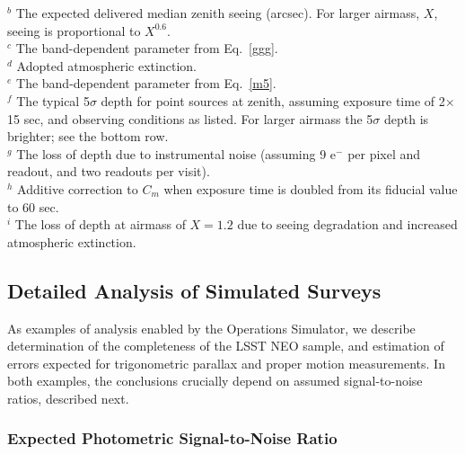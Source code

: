 \documentclass{emulateapj}
\begin{document}
\begin{table}
  $^b$ The expected delivered median zenith seeing (arcsec). For larger
           airmass, $X$, seeing is proportional to $X^{0.6}$. \\
  $^c$ The band-dependent parameter from Eq.~\ref{ggg}. \\
  $^d$ Adopted atmospheric extinction. \\
  $^e$ The band-dependent parameter from Eq.~\ref{m5}. \\
  $^f$ The typical 5$\sigma$ depth for point sources at zenith, assuming exposure time of 
          2$\times$15 sec, and observing conditions as listed. For larger
          airmass the 5$\sigma$ depth is brighter; see the bottom row. \\
  $^g$ The loss of depth due to instrumental noise (assuming 9 e$^-$ per pixel and readout, 
       and two readouts per visit). \\
  $^h$ Additive correction to $C_m$ when exposure time is doubled from its fiducial value 
          to 60 sec. \\
  $^i$ The loss of depth at airmass of $X=1.2$ due to seeing degradation 
                 and increased atmospheric extinction. \\
\end{table}






\subsection{  Detailed Analysis of Simulated Surveys  } 

As examples of analysis enabled by the Operations Simulator, we describe 
determination of the completeness of the LSST NEO sample, and estimation 
of errors expected for trigonometric parallax and proper motion measurements. 
In both examples, the conclusions crucially depend on assumed signal-to-noise
ratios, described next.

\subsubsection{  Expected Photometric Signal-to-Noise Ratio } 
\end{document}
